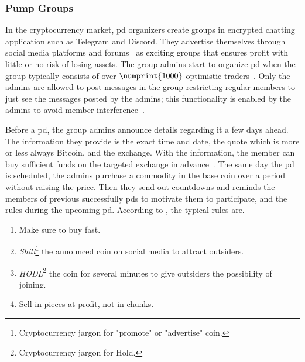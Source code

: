 \subsubsection{Pump Groups}\label{sec:pump_groups}
In the cryptocurrency market, \ac{pd} organizers create groups in encrypted chatting application such as Telegram and Discord. They advertise themselves through social media platforms and forums~\cite{P&D_anatomy, P&D_scheme} as exciting groups that ensures profit with little or no risk of losing assets. The group admins start to organize \ac{pd} when the group typically consists of over $\numprint{1000}$ optimistic traders~\cite{P&D_anatomy}. Only the admins are allowed to post messages in the group restricting regular members to just see the messages posted by the admins; this functionality is enabled by the admins to avoid member interference~\cite{P&D_anatomy}.

Before a \ac{pd}, the group admins announce details regarding it a few days ahead. The information they provide is the exact time and date, the quote which is more or less always Bitcoin, and the exchange. With the information, the member can buy sufficient funds on the targeted exchange in advance~\cite{P&D_anatomy}. The same day the \ac{pd} is scheduled, the admins purchase a commodity in the base coin over a period without raising the price. Then they send out countdowns and reminds the members of previous successfully \acp{pd} to motivate them to participate, and the rules during the upcoming \ac{pd}. According to \cite{P&D_anatomy}, the typical rules are.

\begin{enumerate}
    \item Make sure to buy fast.
    \item \emph{Shill}\footnote{Cryptocurrency jargon for "promote" or "advertise" coin.} the announced coin on social media to attract outsiders.
    \item \emph{HODL}\footnote{Cryptocurrency jargon for Hold.} the coin for several minutes to give outsiders the possibility of joining.
    \item Sell in pieces at profit, not in chunks.
\end{enumerate}


